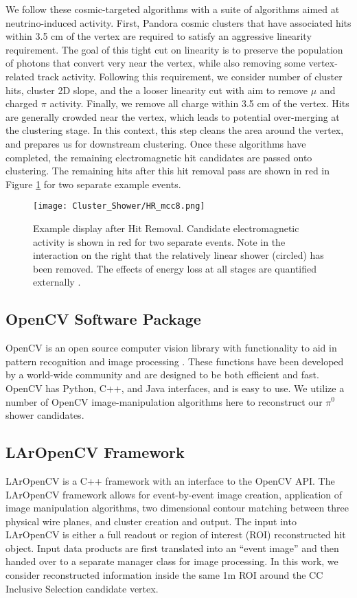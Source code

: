 \par We follow these cosmic-targeted algorithms with a suite of algorithms aimed at neutrino-induced activity. First, Pandora cosmic clusters that have associated hits within 3.5 cm of the vertex are required to satisfy an aggressive linearity requirement. The goal of this tight cut on linearity is to preserve the population of photons that convert very near the vertex, while also removing some vertex-related track activity. Following this requirement, we consider number of cluster hits, cluster 2D slope, and the a looser linearity cut with aim to remove $\mu$ and charged $\pi$ activity. Finally, we remove all charge within 3.5 cm of the vertex. Hits are generally crowded near the vertex, which leads to potential over-merging at the clustering stage. In this context, this step cleans the area around the vertex, and prepares us for downstream clustering. Once these algorithms have completed, the remaining electromagnetic hit candidates are passed onto clustering. The remaining hits after this hit removal pass are shown in red in Figure \ref{fig:hitremoval} for two separate example events. 
\begin{figure}[h!]
\centering
\texttt{[image: Cluster\_Shower/HR\_mcc8.png]}
\caption{ Example display after Hit Removal. Candidate electromagnetic activity is shown in red for two separate events. Note in the interaction on the right that the relatively linear shower (circled) has been removed. The effects of energy loss at all stages are quantified externally \cite{bib:davidc_missingE}.} 
\label{fig:hitremoval}
\end{figure}

\subsection{OpenCV Software Package}
OpenCV is an open source computer vision library with functionality to aid in pattern recognition and image processing \cite{bib:opencv}. These functions have been developed by a world-wide community and are designed to be both efficient and fast. OpenCV has Python, C++, and Java interfaces, and is easy to use. We utilize a number of OpenCV image-manipulation algorithms here to reconstruct our $\pi^0$ shower candidates.  %

\subsection{LArOpenCV Framework}
LArOpenCV is a C++ framework with an interface to the OpenCV API. The LArOpenCV framework allows for event-by-event image creation, application of image manipulation algorithms, two dimensional contour matching between three physical wire planes, and cluster creation and output. The input into LArOpenCV is either a full readout or region of interest (ROI) reconstructed hit object. Input data products are first translated into an ``event image'' and then handed over to a separate manager class for image processing. In this work, we consider reconstructed information inside the same 1m ROI around the CC Inclusive Selection candidate vertex.  

